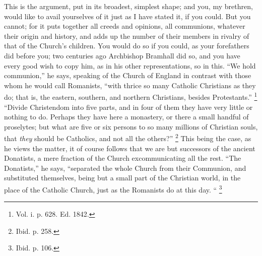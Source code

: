 This is the argument, put in its broadest, simplest shape; and you,
my brethren, would like to avail yourselves of it just as I have
stated it, if you could. But you cannot; for it puts together all
creeds and opinions, all communions, whatever their origin and
history, and adds up the number of their members in rivalry of that of
the Church's children. You would do so if you could, as your
forefathers did before you; two centuries ago Archbishop Bramhall did
so, and you have every good wish to copy him, as in his other
representations, so in this. ``We hold communion,'' he says,
speaking of the Church of England in contrast with those whom he would
call Romanists, ``with thrice so many Catholic Christians as they
do; that is, the eastern, southern, and northern Christians, besides
Protestants.'' \footnote{Vol. i. p. 628. Ed. 1842.}
``Divide Christendom into five parts, and in four of them they
have very little or nothing to do. Perhaps they have here a monastery,
or there a small handful of proselytes; but what are five or six
persons to so many millions of Christian souls, that \emph{they} should be
Catholics, and not all the others?'' \footnote{Ibid. p. 258.} This being the case, as he views the matter, it of course
follows that we are but successors of the ancient Donatists, a mere
fraction of the Church excommunicating all the rest. ``The
Donatists,'' he says, ``separated the whole Church from their
Communion, and substituted themselves, being but a small part of the
Christian world, in the place of the Catholic Church, just as the
Romanists do at this day. `` \footnote{Ibid. p. 106.}

